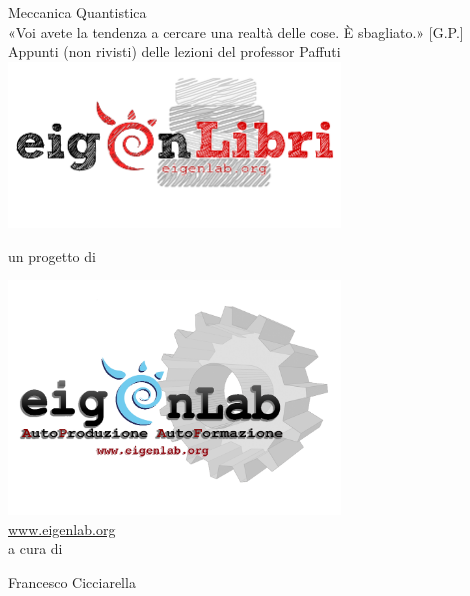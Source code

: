 \documentclass[10pt,a4paper]{report}
\theoremstyle{definition}
\numberwithin{equation}{section}
\begin{document}
\begin{titlepage}
\centering
{\Huge Meccanica Quantistica}\\
\vspace*{0.5cm}
{\normalsize «Voi avete la tendenza a cercare una realtà delle cose. È sbagliato.» [G.P.]} \\
\vspace*{0.5cm}
{\small Appunti (non rivisti) delle lezioni del professor Paffuti}
 \\
\includegraphics[width=250pt,keepaspectratio=true]{eigenLibrichiaro}
\begin{center}
un progetto di
\end{center}
\includegraphics[width=250pt,keepaspectratio=true]{eigenlabinvertito2.png} \\
\url{www.eigenlab.org}
 \\
{\small a cura di}\\
\vspace*{0.5cm}
{\normalsize Francesco Cicciarella\par}
\end{titlepage}
\pagebreak
\end{document}
